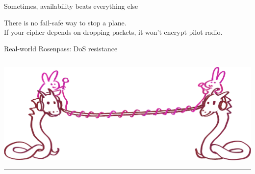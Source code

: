 
\begin{frame}{Sometimes, availability beats everything else}
  \begin{minipage}{.45\pagewidth}
    There is no fail-safe way to stop a plane.
    \\[1.3em] If your cipher depends on dropping packets, it won't encrypt pilot radio.
  \end{minipage}
\end{frame}

\SetNextBackground{}
\begin{frame}{Real-world Rosenpass: DoS resistance}
  \begin{columns}[]
    \begin{column}{.2\textwidth}
      \includegraphics[width=\textwidth-.4pt,clip,trim=0 0 2300 0]{graphics/wireguard-and-rp-bunny-rose.png}\rule{.4pt}{.45\textheight}
    \end{column}


\end{columns}
\end{frame}
